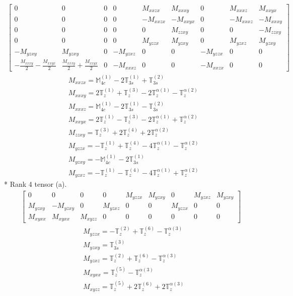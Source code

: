 \documentclass[fleqn,8pt,landscape]{jsarticle}
\begin{document}
\begin{align*}
\begin{bmatrix} 0 & 0 & 0 & 0 & M_{xxzx} & M_{xxxy} & 0 & M_{xxxz} & M_{xxyx} \\ 0 & 0 & 0 & 0 & - M_{xxzx} & - M_{xxyx} & 0 & - M_{xxxz} & - M_{xxxy} \\ 0 & 0 & 0 & 0 & 0 & M_{zzxy} & 0 & 0 & - M_{zzxy} \\ 0 & 0 & 0 & 0 & M_{yzzx} & M_{yzxy} & 0 & M_{yzxz} & M_{yzxy} \\ - M_{yzxy} & M_{yzxy} & 0 & - M_{yzxz} & 0 & 0 & - M_{yzzx} & 0 & 0 \\ - \frac{M_{xxxy}}{2} - \frac{M_{xxyx}}{2} & \frac{M_{xxxy}}{2} + \frac{M_{xxyx}}{2} & 0 & - M_{xxxz} & 0 & 0 & - M_{xxzx} & 0 & 0 \end{bmatrix}
\end{align*}
\begin{align*}
& M_{xxzx} = \mathbb{M}_{4c}^{(1)} - 2 \mathbb{T}_{3s}^{(1)} + \mathbb{T}_{3s}^{(2)} \\
& M_{xxxy} = 2 \mathbb{T}_{z}^{(1)} + \mathbb{T}_{z}^{(3)} - 2 \mathbb{T}_{z}^{\alpha(1)} - \mathbb{T}_{z}^{\alpha(2)} \\
& M_{xxxz} = \mathbb{M}_{4c}^{(1)} - 2 \mathbb{T}_{3s}^{(1)} - \mathbb{T}_{3s}^{(2)} \\
& M_{xxyx} = 2 \mathbb{T}_{z}^{(1)} - \mathbb{T}_{z}^{(3)} - 2 \mathbb{T}_{z}^{\alpha(1)} + \mathbb{T}_{z}^{\alpha(2)} \\
& M_{zzxy} = \mathbb{T}_{z}^{(3)} + 2 \mathbb{T}_{z}^{(4)} + 2 \mathbb{T}_{z}^{\alpha(2)} \\
& M_{yzzx} = - \mathbb{T}_{z}^{(1)} + \mathbb{T}_{z}^{(4)} - 4 \mathbb{T}_{z}^{\alpha(1)} - \mathbb{T}_{z}^{\alpha(2)} \\
& M_{yzxy} = - \mathbb{M}_{4c}^{(1)} - 2 \mathbb{T}_{3s}^{(1)} \\
& M_{yzxz} = - \mathbb{T}_{z}^{(1)} - \mathbb{T}_{z}^{(4)} - 4 \mathbb{T}_{z}^{\alpha(1)} + \mathbb{T}_{z}^{\alpha(2)}
\end{align*}
* Rank 4 tensor (a).
\begin{align*}
\begin{bmatrix} 0 & 0 & 0 & 0 & M_{yzzx} & M_{yzxy} & 0 & M_{yzxz} & M_{yzxy} \\ M_{yzxy} & - M_{yzxy} & 0 & M_{yzxz} & 0 & 0 & M_{yzzx} & 0 & 0 \\ M_{xyxx} & M_{xyxx} & M_{xyzz} & 0 & 0 & 0 & 0 & 0 & 0 \end{bmatrix}
\end{align*}
\begin{align*}
& M_{yzzx} = - \mathbb{T}_{z}^{(2)} + \mathbb{T}_{z}^{(6)} - \mathbb{T}_{z}^{\alpha(3)} \\
& M_{yzxy} = \mathbb{T}_{3s}^{(3)} \\
& M_{yzxz} = \mathbb{T}_{z}^{(2)} + \mathbb{T}_{z}^{(6)} - \mathbb{T}_{z}^{\alpha(3)} \\
& M_{xyxx} = \mathbb{T}_{z}^{(5)} - \mathbb{T}_{z}^{\alpha(3)} \\
& M_{xyzz} = \mathbb{T}_{z}^{(5)} + 2 \mathbb{T}_{z}^{(6)} + 2 \mathbb{T}_{z}^{\alpha(3)}
\end{align*}
\end{document}
